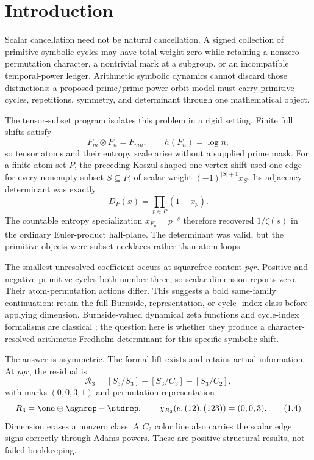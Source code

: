 \section{Introduction}
\label{sec:introduction}

Scalar cancellation need not be natural cancellation.  A signed collection
of primitive symbolic cycles may have total weight zero while retaining a
nonzero permutation character, a nontrivial mark at a subgroup, or an
incompatible temporal-power ledger.  Arithmetic symbolic dynamics cannot
discard those distinctions: a proposed prime/prime-power orbit model must
carry primitive cycles, repetitions, symmetry, and determinant through one
mathematical object.

The tensor-subset program isolates this problem in a rigid setting.  Finite
full shifts satisfy
\[
  F_m\otimes F_n=F_{mn},\qquad h(F_n)=\log n,
  \tag{1.1}
\]
so tensor atoms and their entropy scale arise without a supplied prime mask.
For a finite atom set $P$, the preceding Koszul-shaped one-vertex shift used
one edge for every nonempty subset $S\subseteq P$, of scalar weight
$(-1)^{|S|+1}x_S$.  Its adjacency determinant was exactly
\[
  D_P(x)=\prod_{p\in P}(1-x_p).
  \tag{1.2}
\]
The countable entropy specialization $x_{F_p}=p^{-s}$ therefore recovered
$1/\zeta(s)$ in the ordinary Euler-product half-plane.  The determinant was
valid, but the primitive objects were subset necklaces rather than atom
loops.

The smallest unresolved coefficient occurs at squarefree content $pqr$.
Positive and negative primitive cycles both number three, so scalar dimension
reports zero.  Their atom-permutation actions differ.  This suggests a bold
same-family continuation: retain the full Burnside, representation, or cycle-
index class before applying dimension.  Burnside-valued dynamical zeta
functions and cycle-index formalisms are classical
\citep{LabelleYeh1989BurnsideSpecies,GuseinZadeLuengoMelle2015EquivariantZeta};
the question here is whether they produce a character-resolved arithmetic
Fredholm determinant for this specific symbolic shift.

The answer is asymmetric.  The formal lift exists and retains actual
information.  At $pqr$, the residual is
\[
  \mathcal R_3=[S_3/S_3]+[S_3/C_3]-[S_3/C_2],
  \tag{1.3}
\]
with marks $(0,0,3,1)$ and permutation representation
\[
  R_3=\one\oplus\sgnrep-\stdrep,
  \qquad \chi_{R_3}(e,(12),(123))=(0,0,3).
  \tag{1.4}
\]
Dimension erases a nonzero class.  A $C_2$ color line also carries the scalar
edge signs correctly through Adams powers.  These are positive structural
results, not failed bookkeeping.

